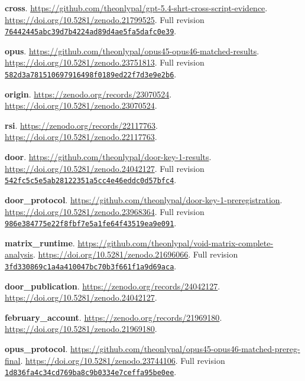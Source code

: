 \documentclass[11pt,letterpaper]{article}
\begin{document}
{\textbf{cross}. \url{https://github.com/theonlypal/gpt-5.4-shrt-cross-script-evidence}. \url{https://doi.org/10.5281/zenodo.21799525}. Full revision \href{https://github.com/theonlypal/gpt-5.4-shrt-cross-script-evidence/commit/76442445abc39d7b4224ad89d4ae5fa5dafc0e39}{\nolinkurl{76442445abc39d7b4224ad89d4ae5fa5dafc0e39}}.

\textbf{opus}. \url{https://github.com/theonlypal/opus45-opus46-matched-results}. \url{https://doi.org/10.5281/zenodo.23751813}. Full revision \href{https://github.com/theonlypal/opus45-opus46-matched-results/commit/582d3a781510697916498f0189ed22f7d3e9e2b6}{\nolinkurl{582d3a781510697916498f0189ed22f7d3e9e2b6}}.

\textbf{origin}. \url{https://zenodo.org/records/23070524}. \url{https://doi.org/10.5281/zenodo.23070524}.

\textbf{rsi}. \url{https://zenodo.org/records/22117763}. \url{https://doi.org/10.5281/zenodo.22117763}.

\textbf{door}. \url{https://github.com/theonlypal/door-key-1-results}. \url{https://doi.org/10.5281/zenodo.24042127}. Full revision \href{https://github.com/theonlypal/door-key-1-results/commit/542fc5c5e5ab28122351a5cc4e46eddc0d57bfc4}{\nolinkurl{542fc5c5e5ab28122351a5cc4e46eddc0d57bfc4}}.

\textbf{door\_protocol}. \url{https://github.com/theonlypal/door-key-1-preregistration}. \url{https://doi.org/10.5281/zenodo.23968364}. Full revision \href{https://github.com/theonlypal/door-key-1-preregistration/commit/986e384775e22f8fbf7e5a1fe64f43519ea9e091}{\nolinkurl{986e384775e22f8fbf7e5a1fe64f43519ea9e091}}.

\textbf{matrix\_runtime}. \url{https://github.com/theonlypal/void-matrix-complete-analysis}. \url{https://doi.org/10.5281/zenodo.21696066}. Full revision \href{https://github.com/theonlypal/void-matrix-complete-analysis/commit/3fd330869c1a4a410047bc70b3f661f1a9d69aca}{\nolinkurl{3fd330869c1a4a410047bc70b3f661f1a9d69aca}}.

\textbf{door\_publication}. \url{https://zenodo.org/records/24042127}. \url{https://doi.org/10.5281/zenodo.24042127}.

\textbf{february\_account}. \url{https://zenodo.org/records/21969180}. \url{https://doi.org/10.5281/zenodo.21969180}.

\textbf{opus\_protocol}. \url{https://github.com/theonlypal/opus45-opus46-matched-prereg-final}. \url{https://doi.org/10.5281/zenodo.23744106}. Full revision \href{https://github.com/theonlypal/opus45-opus46-matched-prereg-final/commit/1d836fa4c34cd769ba8c9b0334e7ceffa95be0ee}{\nolinkurl{1d836fa4c34cd769ba8c9b0334e7ceffa95be0ee}}.

}
\end{document}
